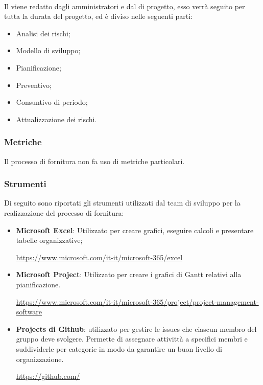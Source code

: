 \paragraph*{\docNamePdP{}}\label{paragraph: PdP_fornitura}
Il \docNamePdPLow{} viene redatto dagli amministratori e dal \roleProjectManagerLow{} di progetto, esso verrà seguito per tutta la durata del progetto, ed è diviso nelle seguenti parti:
\begin{itemize}
    \item Analisi dei rischi;
    \item Modello di sviluppo;
    \item Pianificazione;
    \item Preventivo;
    \item Consuntivo di periodo;
    \item Attualizzazione dei rischi.
\end{itemize}





\subsubsection{Metriche}
Il processo di fornitura non fa uso di metriche particolari.
\subsubsection{Strumenti}\label{sssec:strumenti_fornitura}
Di seguito sono riportati gli strumenti utilizzati dal team di sviluppo per la realizzazione del processo di fornitura:
\begin{itemize}
    \item \textbf{Microsoft Excel}: Utilizzato per creare grafici, eseguire calcoli e presentare tabelle organizzative;
          \begin{center}
              \url{https://www.microsoft.com/it-it/microsoft-365/excel}
          \end{center}
    \item \textbf{Microsoft Project}: Utilizzato per creare i grafici di Gantt\glo{} relativi alla pianificazione.
          \begin{center}
              \url{https://www.microsoft.com/it-it/microsoft-365/project/project-management-software}
          \end{center}
          \vspace{2cm}
    \item \textbf{Projects di Github}: utilizzato per gestire le issues\glo{} che ciascun membro del gruppo deve svolgere.
          Permette di assegnare attivittà a specifici membri e suddividerle per categorie in modo da garantire un buon livello di organizzazione.
          \begin{center}
              \url{https://github.com/}
          \end{center}
\end{itemize}

